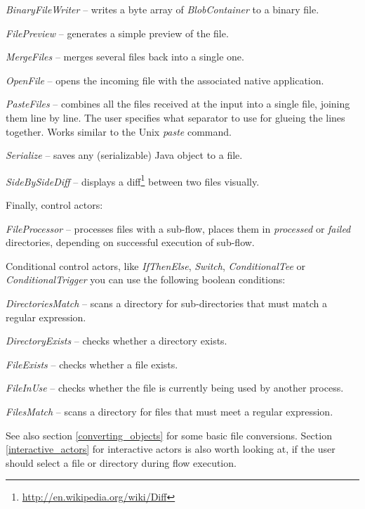 \begin{tight_itemize}
	\item \textit{BinaryFileWriter} -- writes a byte array of 
	\textit{BlobContainer} to a binary file.
	\item \textit{FilePreview} -- generates a simple preview of the file.
	\item \textit{MergeFiles} -- merges several files back into a single one.
	\item \textit{OpenFile} -- opens the incoming file with the associated
	native application.
	\item \textit{PasteFiles} -- combines all the files received at the input into
	a single file, joining them line by line. The user specifies what separator to
	use for glueing the lines together. Works similar to the Unix \textit{paste}
	command.
	\item \textit{Serialize} -- saves any (serializable) Java object to a file.
	\item \textit{SideBySideDiff} -- displays a diff\footnote{\url{http://en.wikipedia.org/wiki/Diff}{}} 
	between two files visually.
\end{tight_itemize}
Finally, control actors:
\begin{tight_itemize}
	\item \textit{FileProcessor} -- processes files with a sub-flow, places
	them in \textit{processed} or \textit{failed} directories, depending on
	successful execution of sub-flow.
\end{tight_itemize}
Conditional control actors, like \textit{IfThenElse}, \textit{Switch}, 
\textit{ConditionalTee} or \textit{ConditionalTrigger} you can use the following
boolean conditions:
\begin{tight_itemize}
	\item \textit{DirectoriesMatch} -- scans a directory for sub-directories 
	that must match a regular expression.
	\item \textit{DirectoryExists} -- checks whether a directory exists.
	\item \textit{FileExists} -- checks whether a file exists.
	\item \textit{FileInUse} -- checks whether the file is currently being
	used by another process.
	\item \textit{FilesMatch} -- scans a directory for files that must meet
	a regular expression.
\end{tight_itemize}
See also section \ref{converting_objects} for some basic file conversions.
Section \ref{interactive_actors} for interactive actors is also worth looking
at, if the user should select a file or directory during flow execution.

